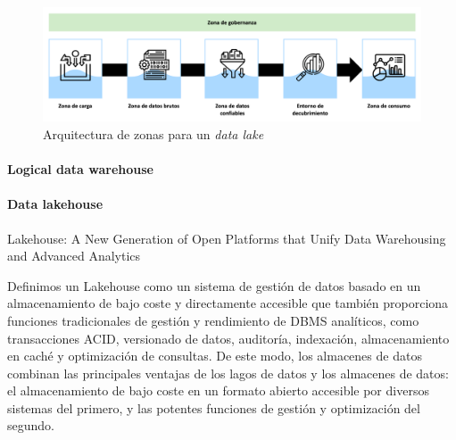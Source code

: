 \begin{figure}[h!]
    \centering
    \includegraphics[width=\textwidth]{Images/zone-architecture.png}
    \caption{Arquitectura de zonas para un \textit{data lake}}
    \label{fig:zone-architecture}
\end{figure}



\paragraph{Logical data warehouse\newline}


\paragraph{Data lakehouse\newline}

Lakehouse: A New Generation of Open Platforms that Unify Data Warehousing and Advanced Analytics

Definimos un Lakehouse como un sistema de gestión de datos basado en un almacenamiento de bajo coste y directamente accesible que también proporciona funciones tradicionales de gestión y rendimiento de DBMS analíticos, como transacciones ACID, versionado de datos, auditoría, indexación, almacenamiento en caché y optimización de consultas. De este modo, los almacenes de datos combinan las principales ventajas de los lagos de datos y los almacenes de datos: el almacenamiento de bajo coste en un formato abierto accesible por diversos sistemas del primero, y las potentes funciones de gestión y optimización del segundo.

